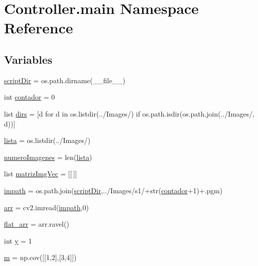 \hypertarget{namespace_controller_1_1main}{}\section{Controller.\+main Namespace Reference}
\label{namespace_controller_1_1main}
\subsection*{Variables}
\begin{DoxyCompactItemize}
\item 
\hyperlink{namespace_controller_1_1main_afde056e3ffb39cf4210266e4a3c724ec}{script\+Dir} = os.\+path.\+dirname(\+\_\+\+\_\+file\+\_\+\+\_\+)
\item 
int \hyperlink{namespace_controller_1_1main_a551a13a2be12ee8db7e027437ded21e7}{contador} = 0
\item 
list \hyperlink{namespace_controller_1_1main_adc676146e1b9b81c62c7d962e6a09b73}{dirs} = \mbox{[}d for d in os.\+listdir(\textquotesingle{}../Images/\textquotesingle{}) if os.\+path.\+isdir(os.\+path.\+join(\textquotesingle{}../Images/\textquotesingle{}, d))\mbox{]}
\item 
\hyperlink{namespace_controller_1_1main_a6808351aab7a7dabdfde550a30c719b1}{lista} = os.\+listdir(\textquotesingle{}../Images/\textquotesingle{})
\item 
\hyperlink{namespace_controller_1_1main_ab64b1d5d85baa87feb723b5020958dc9}{numero\+Imagenes} = len(\hyperlink{namespace_controller_1_1main_a6808351aab7a7dabdfde550a30c719b1}{lista})
\item 
list \hyperlink{namespace_controller_1_1main_a4272c41c978f6d49bb441a74e2f83b97}{matriz\+Img\+Vec} = \mbox{[}\mbox{[}$\,$\mbox{]}\mbox{]}
\item 
\hyperlink{namespace_controller_1_1main_ada4e168ced647a0550eb8ae2c15e1037}{impath} = os.\+path.\+join(\hyperlink{namespace_controller_1_1main_afde056e3ffb39cf4210266e4a3c724ec}{script\+Dir},\textquotesingle{}../Images/s1/\textquotesingle{}+str(\hyperlink{namespace_controller_1_1main_a551a13a2be12ee8db7e027437ded21e7}{contador}+1)+\textquotesingle{}.pgm\textquotesingle{})
\item 
\hyperlink{namespace_controller_1_1main_adad82d87439471603c309d29ce1fcd16}{arr} = cv2.\+imread(\hyperlink{namespace_controller_1_1main_ada4e168ced647a0550eb8ae2c15e1037}{impath},0)
\item 
\hyperlink{namespace_controller_1_1main_aedd35c1d9c6106eaec585482a5020709}{flat\+\_\+arr} = arr.\+ravel()
\item 
int \hyperlink{namespace_controller_1_1main_a71a788edfd86f78336518c22203e2bc4}{y} = 1
\item 
\hyperlink{namespace_controller_1_1main_a16245faf87dfaee9eec6634fd40179c0}{m} = np.\+cov(\mbox{[}\mbox{[}1,2\mbox{]},\mbox{[}3,4\mbox{]}\mbox{]})
\end{DoxyCompactItemize}


